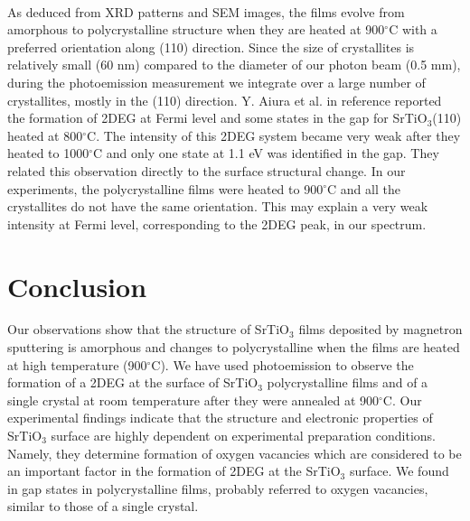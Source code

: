 \documentclass{aip-cp}
\begin{document}
\\As deduced from XRD patterns and SEM images, the films evolve from amorphous to polycrystalline structure when they are heated at 900$^{\circ}$C with a preferred orientation along (110) direction. Since the size of crystallites is relatively small (60 nm) compared to the diameter of our photon beam (0.5 mm), during the photoemission measurement we integrate over a large number of crystallites, mostly in the (110) direction. Y. Aiura et al. in reference \cite{Y} reported the formation of 2DEG at Fermi level and some states in the gap for SrTiO$_{3}$(110) heated at 800$^{\circ}$C. The intensity of this 2DEG system became very weak after they heated to 1000$^{\circ}$C and only one state at 1.1 eV was identified in the gap. They related this observation directly to the surface structural change. In our experiments, the polycrystalline films were heated to 900$^{\circ}$C and all the crystallites do not have the same orientation. This may explain a very weak intensity at Fermi level, corresponding to the 2DEG peak, in our spectrum.  
\section{Conclusion}
Our observations show that the structure of SrTiO$_{3}$ films deposited by magnetron sputtering is amorphous and changes to polycrystalline when the films are heated at high temperature (900$^{\circ}$C). We have used photoemission to observe the formation of a 2DEG at the surface of SrTiO$_{3}$ polycrystalline films and of a single crystal at room temperature after they were annealed at 900$^{\circ}$C. Our experimental findings indicate that the structure and electronic properties of SrTiO$_{3}$ surface are highly dependent on experimental preparation conditions. Namely, they determine formation of oxygen vacancies which are considered to be an important factor in the formation of 2DEG at the SrTiO$_{3}$ surface. We found in gap states in polycrystalline films, probably referred to oxygen vacancies, similar to those of a single crystal.     
\end{document}
